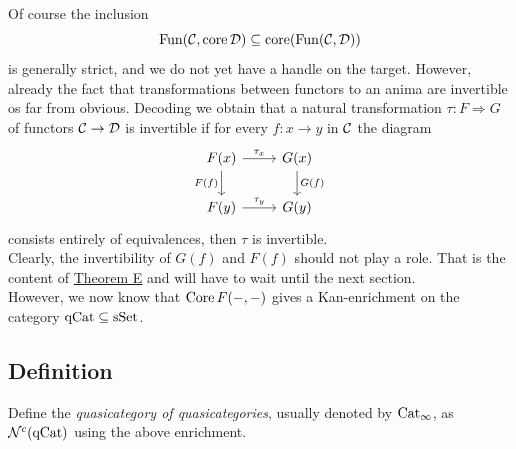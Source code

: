         Of course the inclusion
        \begin{equation*}
            \operatorname{Fun}(\mathcal{C}, \operatorname{core} \mathcal{D}) \subseteq \operatorname{core}(\operatorname{Fun}(\mathcal{C}, \mathcal{D}))
        \end{equation*}
        is generally strict, and we do not yet have a handle on the target. However, already the fact that transformations between functors to an anima are invertible os far from obvious. Decoding we obtain that a natural transformation $\tau \colon F \Rightarrow G$ of functors $\mathcal{C} \to \mathcal{D}$ is invertible if for every $f \colon x \to y$ in $\mathcal{C}$ the diagram
        \begin{equation*}
            \begin{tikzcd}
                F(x) \arrow[d, "F(f)"'] \arrow[r, "\tau_x"] & G(x) \arrow[d, "G(f)"] \\
                F(y) \arrow[r, "\tau_y"] & G(y)
            \end{tikzcd}
        \end{equation*}
        consists entirely of equivalences, then $\tau$ is invertible.\\
        Clearly, the invertibility of $G(f)$ and $F(f)$ should not play a role. That is the content of \hyperref[chIII-thm-e]{Theorem E} and will have to wait until the next section.\\
        However, we now know that $\operatorname{Core} F(-, -)$ gives a Kan-enrichment on the category $\mathrm{qCat} \subseteq \operatorname{sSet}$.

    \subsection{Definition}\label{chVI-3-23}
        Define the \emph{quasicategory of quasicategories}, usually denoted by $\operatorname{Cat}_{\infty}$, as $\mathcal{N}^c(\mathrm{qCat})$ using the above enrichment.
        \medskip

